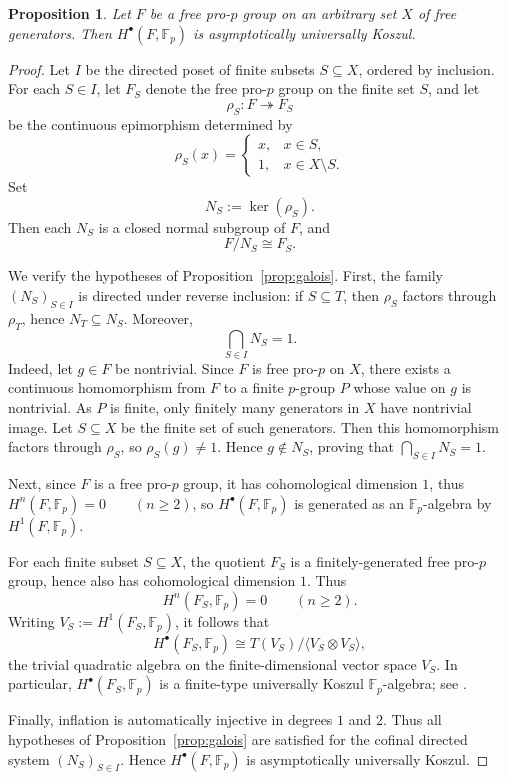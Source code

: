 \documentclass[11pt]{amsart}
\numberwithin{equation}{section}
\newtheorem{proposition}[theorem]{Proposition}
\theoremstyle{definition}
\begin{document}
	\begin{proposition}
		Let \(F\) be a free pro-\(p\) group on an arbitrary set \(X\) of free generators. Then $H^\bullet(F,\mathbb{F}_p)$ is asymptotically universally Koszul.
	\end{proposition}
	
	\begin{proof}
		Let \(I\) be the directed poset of finite subsets \(S\subseteq X\), ordered by inclusion. For each
		\(S\in I\), let \(F_S\) denote the free pro-\(p\) group on the finite set \(S\), and let
		\[\rho_S\colon F\twoheadrightarrow F_S\] be the continuous epimorphism determined by
		\[\rho_S(x)=\begin{cases} x,& x\in S,\\ 1,& x\in X\setminus S. \end{cases} \]
		Set
		\[N_S:=\ker(\rho_S).\]
		Then each \(N_S\) is a closed normal subgroup of \(F\), and
		\[F/N_S \cong F_S.\]
		
		We verify the hypotheses of Proposition~\ref{prop:galois}. First, the family \((N_S)_{S\in I}\) is directed under reverse inclusion: if \(S\subseteq T\), then \(\rho_S\) factors through \(\rho_T\), hence $N_T\subseteq N_S.$ Moreover, \[ \bigcap_{S\in I} N_S = 1. \]
		Indeed, let \(g\in F\) be nontrivial. Since \(F\) is free pro-\(p\) on \(X\), there exists a continuous homomorphism from \(F\) to a finite \(p\)-group \(P\) whose value on \(g\) is nontrivial. As \(P\) is finite, only finitely many generators in \(X\) have nontrivial image. Let \(S\subseteq X\) be the finite set of such generators. Then this homomorphism factors through \(\rho_S\), so \(\rho_S(g)\neq 1\). Hence \(g\notin N_S\), proving that \(\bigcap_{S\in I}N_S=1\).
		
		Next, since \(F\) is a free pro-\(p\) group, it has cohomological dimension \(1\), thus $	H^n(F,\mathbb F_p)=0 \qquad (n\geq 2)$, so \(H^\bullet(F,\mathbb F_p)\) is generated as an \(\mathbb{F}_p\)-algebra by \(H^1(F,\mathbb{F}_p)\).
		
		For each finite subset $S \subseteq X$, the quotient $F_S$ is a
		finitely-generated free pro-$p$ group, hence also has cohomological
		dimension $1$. Thus
		\[
		H^n(F_S,\mathbb{F}_p)=0 \qquad (n\geq 2).
		\]
		Writing $V_S:=H^1(F_S,\mathbb{F}_p)$, it follows that
		\[
		H^\bullet(F_S,\mathbb{F}_p)
		\cong T(V_S)/\langle V_S\otimes V_S\rangle,
		\]
		the trivial quadratic algebra on the finite-dimensional vector space
		$V_S$. In particular, $H^\bullet(F_S,\mathbb{F}_p)$ is a finite-type
		universally Koszul $\mathbb{F}_p$-algebra; see \cite{Quadrelli}.
		
		Finally, inflation is automatically injective in degrees \(1\) and \(2\). Thus all hypotheses of Proposition~\ref{prop:galois} are satisfied for the cofinal directed system \((N_S)_{S\in I}\). Hence $H^\bullet(F,\mathbb{F}_p)$ is asymptotically universally Koszul.
	\end{proof}
	
\end{document}
